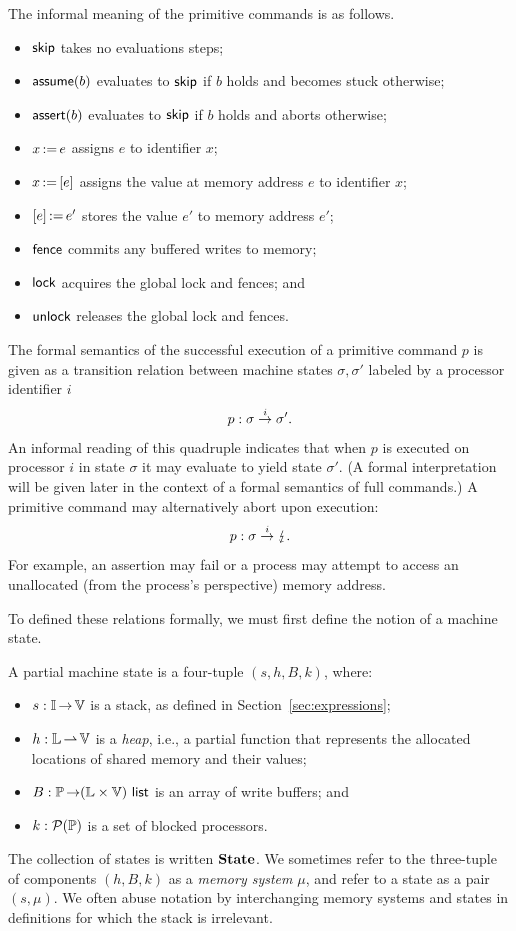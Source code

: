 \documentclass[11pt]{report}
\begin{document}
The informal meaning of the primitive commands is as follows. \begin{itemize}
	\item $\operatorname{\mathsf{skip}}$ takes no evaluations steps;
	\item $\operatorname{\mathsf{assume}}(b)$ evaluates to $\operatorname{\mathsf{skip}}$ if $b$ holds and becomes stuck otherwise; 
	\item $\operatorname{\mathsf{assert}}(b)$ evaluates to $\operatorname{\mathsf{skip}}$ if $b$ holds and aborts otherwise;
	\item $x \operatorname{:\!=} e$ assigns $e$ to identifier $x$; 
	\item $x \operatorname{:\!=} \left[ e \right]$ assigns the value at memory address $e$ to identifier $x$; 
	\item $\left[ e \right] \operatorname{:\!=} e'$ stores the value $e'$ to memory address $e'$; 
	\item $\operatorname{\mathsf{fence}}$ commits any buffered writes to memory; 
	\item $\operatorname{\mathsf{lock}}$ acquires the global lock and fences; and
	\item $\operatorname{\mathsf{unlock}}$ releases the global lock and fences.
\end{itemize}

The formal semantics of the successful execution of a primitive command $p$ is given as a transition relation between machine states $\sigma,\sigma'$ labeled by a processor identifier $i$ \[ p : \sigma \stackrel{i}{\rightarrow} \sigma'. \] An informal reading of this quadruple indicates that when $p$ is executed on processor $i$ in state $\sigma$ it may evaluate to yield state $\sigma'$. (A formal interpretation will be given later in the context of a formal semantics of full commands.) A primitive command may alternatively abort upon execution: \[ p : \sigma \stackrel{i}{\rightarrow} \lightning. \] For example, an assertion may fail or a process may attempt to access an unallocated (from the process's perspective) memory address. 

To defined these relations formally, we must first define the notion of a machine state. 

\begin{definition}
A partial machine state is a four-tuple $(s,h,B,k)$, where: \begin{itemize}
	\item $s : \mathbb{I} \operatorname{\rightarrow} \mathbb{V}$ is a stack, as defined in Section~\ref{sec:expressions};
	\item $h : \mathbb{L} \operatorname{\rightharpoonup} \mathbb{V}$ is a \emph{heap}, i.e., a partial function that represents the allocated locations of shared memory and their values; 
	\item $B : \mathbb{P} \operatorname{\rightarrow} (\mathbb{L} \times \mathbb{V})~\mathsf{list}$ is an array of write buffers; and
	\item $k : \mathcal{P}(\mathbb{P})$ is a set of blocked processors. 
\end{itemize}
\end{definition} 
The collection of states is written $\mathbf{State}$. We sometimes refer to the three-tuple of components $(h,B,k)$ as a \emph{memory system} $\mu$, and refer to a state as a pair $(s,\mu)$. We often abuse notation by interchanging memory systems and states in definitions for which the stack is irrelevant. 
\end{document}
